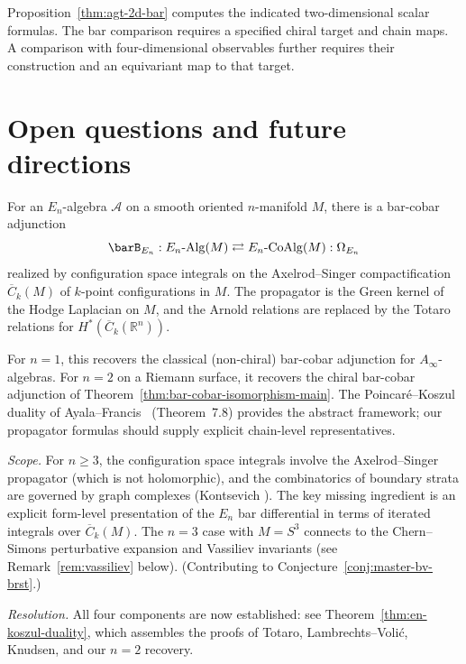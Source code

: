 \begin{remark}[Scope]
Proposition~\ref{thm:agt-2d-bar} computes the indicated two-dimensional scalar formulas.
The bar comparison requires a specified chiral target and chain maps.
A comparison with four-dimensional observables further requires their construction and an equivariant map to that target.
\end{remark}



\section{Open questions and future directions}
\label{sec:open-questions-holo-topo}

\begin{theorem}\label{thm:en-koszul}
For an $E_n$-algebra $\mathcal{A}$ on a smooth oriented $n$-manifold $M$,
there is a bar-cobar adjunction
\begin{equation}\label{eq:en-bar-cobar}
\barB_{E_n}: E_n\text{-}\mathrm{Alg}(M)
\rightleftarrows
E_n\text{-}\mathrm{CoAlg}(M) :\Omega_{E_n}
\end{equation}
realized by configuration space integrals on the Axelrod--Singer
compactification $\overline{C}_k(M)$ of $k$-point configurations in $M$.
The propagator is the Green kernel of the Hodge Laplacian on $M$, and
the Arnold relations are replaced by the Totaro relations
\cite{Totaro96} for $H^*(\overline{C}_k(\mathbb{R}^n))$.

For $n = 1$, this recovers the classical (non-chiral) bar-cobar
adjunction for $A_\infty$-algebras.  For $n = 2$ on a Riemann surface,
it recovers the chiral bar-cobar adjunction of
Theorem~\textup{\ref{thm:bar-cobar-isomorphism-main}}.
The Poincar\'e--Koszul duality of Ayala--Francis~\cite{AF15}
\textup{(}Theorem~7.8\textup{)} provides the abstract framework;
our propagator formulas should supply explicit chain-level
representatives.

\emph{Scope.}  For $n \geq 3$, the configuration space integrals involve
the Axelrod--Singer propagator (which is not holomorphic), and the
combinatorics of boundary strata are governed by graph complexes
(Kontsevich \cite{Kon94}).  The key missing ingredient is an
explicit form-level presentation of the $E_n$ bar differential in terms
of iterated integrals over $\overline{C}_k(M)$.  The $n = 3$ case
with $M = S^3$ connects to the Chern--Simons perturbative expansion and
Vassiliev invariants (see Remark~\textup{\ref{rem:vassiliev}} below).
(Contributing to Conjecture~\ref{conj:master-bv-brst}.)

\emph{Resolution.}  All four components are now
established: see Theorem~\textup{\ref{thm:en-koszul-duality}}, which
assembles the proofs of Totaro, Lambrechts--Voli\'c, Knudsen, and
our $n = 2$ recovery.
\end{theorem}


